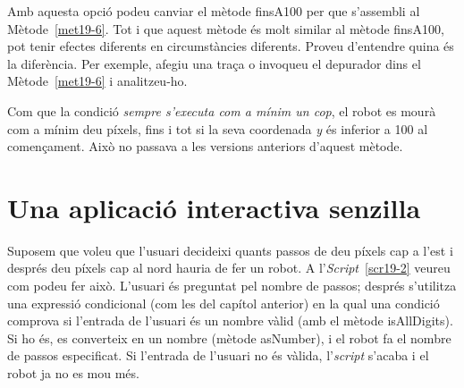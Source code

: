 Amb aquesta opció podeu canviar el mètode \textsf{finsA100} per que s'assembli al Mètode~\ref{met19-6}. Tot i que aquest mètode és molt similar al mètode \textsf{finsA100}, pot tenir efectes diferents en circumstàncies diferents. Proveu d'entendre quina és la diferència. Per exemple, afegiu una traça o invoqueu el depurador dins el Mètode~\ref{met19-6} i analitzeu-ho.

Com que la condició \emph{sempre s'executa com a mínim un cop}, el robot es mourà com a mínim deu píxels, fins i tot si la seva coordenada \emph{y} és inferior a 100 al començament. Això no passava a les versions anteriors d'aquest mètode.

\section{Una aplicació interactiva senzilla}
Suposem que voleu que l'usuari decideixi quants passos de deu píxels cap a l'est i després deu píxels cap al nord hauria de fer un robot. A l'\emph{Script}~\ref{scr19-2} veureu com podeu fer això. L'usuari és preguntat pel nombre de passos; després s'utilitza una expressió condicional (com les del capítol anterior) en la qual una condició comprova si l'entrada de l'usuari és un nombre vàlid (amb el mètode \textsf{isAllDigits}). Si ho és, es converteix en un nombre (mètode \textsf{asNumber}), i el robot fa el nombre de passos especificat. Si l'entrada de l'usuari no és vàlida, l'\emph{script} s'acaba i el robot ja no es mou més. 


